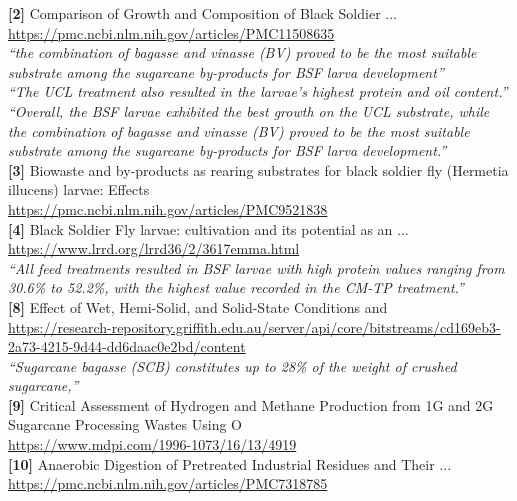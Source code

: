 \textbf{[2]} Comparison of Growth and Composition of Black Soldier ...\\[0.15em]
\url{https://pmc.ncbi.nlm.nih.gov/articles/PMC11508635}\\[0.2em]
\emph{``the combination of bagasse and vinasse (BV) proved to be the most suitable substrate among the sugarcane by-products for BSF larva development''}\\[0.45em]
\emph{``The UCL treatment also resulted in the larvae’s highest protein and oil content.''}\\[0.45em]
\emph{``Overall, the BSF larvae exhibited the best growth on the UCL substrate, while the combination of bagasse and vinasse (BV) proved to be the most suitable substrate among the sugarcane by-products for BSF larva development.''}\\[0.45em]

\textbf{[3]} Biowaste and by-products as rearing substrates for black soldier fly (Hermetia illucens) larvae: Effects \\[0.15em]
\url{https://pmc.ncbi.nlm.nih.gov/articles/PMC9521838}\\[0.2em]

\textbf{[4]} Black Soldier Fly larvae: cultivation and its potential as an ...\\[0.15em]
\url{https://www.lrrd.org/lrrd36/2/3617emma.html}\\[0.2em]
\emph{``All feed treatments resulted in BSF larvae with high protein values ranging from 30.6\% to 52.2\%, with the highest value recorded in the CM-TP treatment.''}\\[0.45em]

\textbf{[8]} Effect of Wet, Hemi-Solid, and Solid-State Conditions and\\[0.15em]
\url{https://research-repository.griffith.edu.au/server/api/core/bitstreams/cd169eb3-2a73-4215-9d44-dd6daac0e2bd/content}\\[0.2em]
\emph{``Sugarcane bagasse (SCB) constitutes up to 28\% of the weight of crushed sugarcane,''}\\[0.45em]

\textbf{[9]} Critical Assessment of Hydrogen and Methane Production from 1G and 2G Sugarcane Processing Wastes Using O\\[0.15em]
\url{https://www.mdpi.com/1996-1073/16/13/4919}\\[0.2em]

\textbf{[10]} Anaerobic Digestion of Pretreated Industrial Residues and Their ...\\[0.15em]
\url{https://pmc.ncbi.nlm.nih.gov/articles/PMC7318785}\\[0.2em]

